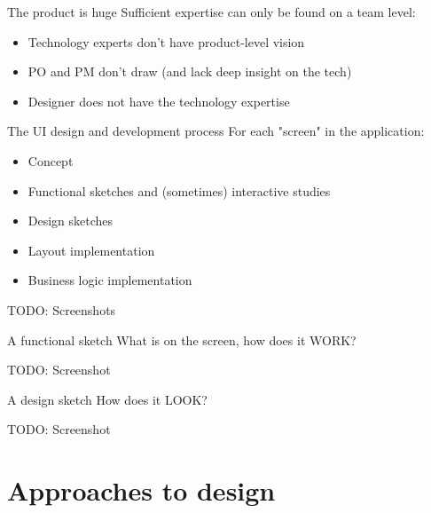 \documentclass[aspectratio=43,handout,bigger]{beamer}
\begin{document}
\begin{frame}{The product is huge}
  Sufficient expertise can only be found on a team level:

  \begin{itemize}
    \item Technology experts don't have product-level vision
    \item PO and PM don't draw (and lack deep insight on the tech)
    \item Designer does not have the technology expertise
  \end{itemize}
\end{frame}


\begin{frame}{The UI design and development process}
  For each "screen" in the application:

  \begin{itemize}
    \item Concept
    \item Functional sketches and (sometimes) interactive studies
    \item Design sketches
    \item Layout implementation
    \item Business logic implementation
  \end{itemize}

  TODO: Screenshots
\end{frame}


\begin{frame}{A functional sketch}
  What is on the screen, how does it WORK?

  TODO: Screenshot
\end{frame}


\begin{frame}{A design sketch}
  How does it LOOK?

  TODO: Screenshot
\end{frame}


\section{Approaches to design}
\end{document}
